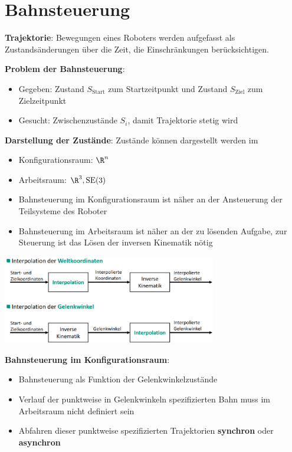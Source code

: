 \section{Bahnsteuerung}

\textbf{Trajektorie}: Bewegungen eines Roboters werden aufgefasst als Zustandsänderungen über die Zeit, die Einschränkungen berücksichtigen.

\textbf{Problem der Bahnsteuerung}:
\begin{itemize}
	\item Gegeben: Zustand $S_\text{Start}$ zum Startzeitpunkt und Zustand $S_\text{Ziel}$ zum Zielzeitpunkt
	\item Gesucht: Zwischenzustände $S_i$, damit Trajektorie stetig wird
\end{itemize}

\textbf{Darstellung der Zustände}: Zustände können dargestellt werden im
\begin{itemize}
	\item Konfigurationsraum: $\R^n$
	\item Arbeitsraum: $\R^3, \text{SE}(3)$
	\item Bahnsteuerung im Konfigurationsraum ist näher an der Ansteuerung der Teilsysteme des Roboter
	\item Bahnsteuerung im Arbeitsraum ist näher an der zu lösenden Aufgabe, zur Steuerung ist das Lösen der inversen Kinematik nötig
\end{itemize}

\begin{center}
	\includegraphics[width=0.7\textwidth]{images/interpolation.png}
\end{center}

\textbf{Bahnsteuerung im Konfigurationsraum}:
\begin{itemize}
	\item Bahnsteuerung als Funktion der Gelenkwinkelzustände
	\item Verlauf der punktweise in Gelenkwinkeln spezifizierten Bahn muss im Arbeitsraum nicht definiert sein
	\item Abfahren dieser punktweise spezifizierten Trajektorien \textbf{synchron} oder \textbf{asynchron}
\end{itemize}

